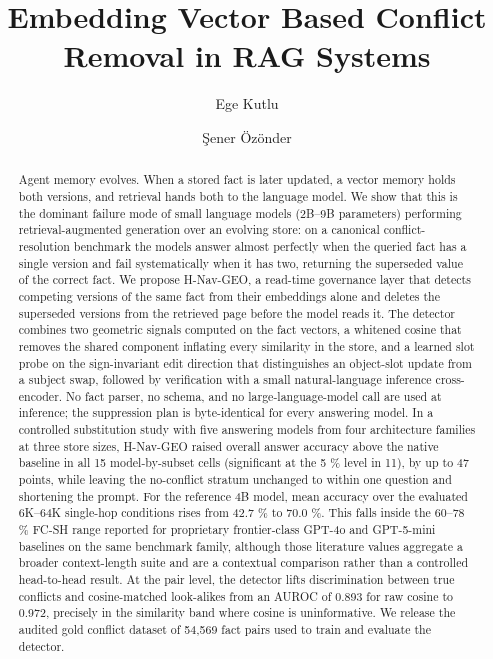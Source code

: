 \documentclass[journal=jcisd8,manuscript=article]{achemso}
\title{Embedding Vector Based Conflict Removal in RAG Systems}
\author{Ege Kutlu}
\affiliation{Institute for Data Science \& Artificial Intelligence, Bo\u{g}azi\c{c}i University, \.{I}stanbul, T\"{u}rkiye}
\author{\c{S}ener \"Oz\"onder}
\affiliation{Institute for Data Science \& Artificial Intelligence, Bo\u{g}azi\c{c}i University, \.{I}stanbul, T\"{u}rkiye}
\begin{document}
\maketitle

\begin{abstract}
Agent memory evolves. When a stored fact is later updated, a vector memory holds both versions, and retrieval hands both to the language model. We show that this is the dominant failure mode of small language models (2B--9B parameters) performing retrieval-augmented generation over an evolving store: on a canonical conflict-resolution benchmark the models answer almost perfectly when the queried fact has a single version and fail systematically when it has two, returning the superseded value of the correct fact. We propose H-Nav-GEO, a read-time governance layer that detects competing versions of the same fact from their embeddings alone and deletes the superseded versions from the retrieved page before the model reads it. The detector combines two geometric signals computed on the fact vectors, a whitened cosine that removes the shared component inflating every similarity in the store, and a learned slot probe on the sign-invariant edit direction that distinguishes an object-slot update from a subject swap, followed by verification with a small natural-language inference cross-encoder. No fact parser, no schema, and no large-language-model call are used at inference; the suppression plan is byte-identical for every answering model. In a controlled substitution study with five answering models from four architecture families at three store sizes, H-Nav-GEO raised overall answer accuracy above the native baseline in all 15 model-by-subset cells (significant at the 5 \% level in 11), by up to 47 points, while leaving the no-conflict stratum unchanged to within one question and shortening the prompt. For the reference 4B model, mean accuracy over the evaluated 6K--64K single-hop conditions rises from 42.7 \% to 70.0 \%. This falls inside the 60--78 \% FC-SH range reported for proprietary frontier-class GPT-4o and GPT-5-mini baselines on the same benchmark family, although those literature values aggregate a broader context-length suite and are a contextual comparison rather than a controlled head-to-head result. At the pair level, the detector lifts discrimination between true conflicts and cosine-matched look-alikes from an AUROC of 0.893 for raw cosine to 0.972, precisely in the similarity band where cosine is uninformative. We release the audited gold conflict dataset of 54,569 fact pairs used to train and evaluate the detector.
\end{abstract}
\end{document}
